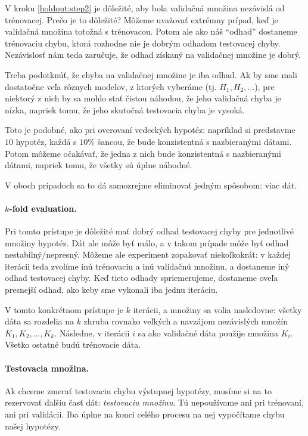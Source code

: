 V kroku \ref{holdout:step2} je dôležité, aby bola validačná
množina nezávislá od trénovacej. Prečo je to dôležité? Môžeme uvažovať
extrémny prípad, keď je validačná množina totožná s trénovacou. Potom
ale ako náš ``odhad'' dostaneme trénovaciu chybu, ktorá rozhodne nie
je dobrým odhadom testovacej chyby. Nezávislosť nám teda zaručuje, že
odhad získaný na validačnej množine je dobrý.

\begin{remark}
  Treba podotknúť, že chyba na validačnej množine je iba odhad. Ak
  by sme mali dostatočne veľa rôznych modelov, z ktorých vyberáme
  (tj. $H_1, H_2, \ldots$), pre niektorý z nich by sa mohlo stať čistou
  náhodou, že jeho validačná chyba je nízka, napriek tomu, že jeho
  skutočná testovacia chyba je vysoká.
  
  Toto je podobné, ako pri overovaní vedeckých hypotéz: napríklad si
  predstavme $10$ hypotéz, každá s $10\%$ šancou, že bude konzistentná
  s nazbieranými dátami. Potom môžeme očakávať, že jedna z nich bude
  konzistentná s nazbieranými dátami, napriek tomu, že všetky sú úplne
  náhodné.
  
  V oboch prípadoch sa to dá samozrejme eliminovať jedným spôsobom:
  viac dát.
\end{remark}

\paragraph{$k$-fold evaluation.} Pri tomto prístupe je dôležité mať
dobrý odhad testovacej chyby pre jednotlivé množiny hypotéz. Dát ale
môže byť málo, a v takom prípade môže byť odhad nestabilný/nepresný.
Môžeme ale experiment zopakovať niekoľkokrát: v každej iterácii teda
zvolíme inú trénovaciu a inú validačnú množinu, a dostaneme iný odhad
testovacej chyby. Keď tieto odhady spriemerujeme, dostaneme oveľa
presnejší odhad, ako keby sme vykonali iba jednu iteráciu.

V tomto konkrétnom prístupe je $k$ iterácii, a množiny sa volia
nasledovne: všetky dáta sa rozdelia na $k$ zhruba rovnako veľkých
a navzájom nezávislých množín $K_1, K_2, \ldots, K_k$. Následne,
v iterácii $i$ sa ako validačné dáta použije množina $K_i$. Všetko
ostatné budú trénovacie dáta.

\paragraph{Testovacia množina.} Ak chceme zmerať testovaciu chybu
výstupnej hypotézy, musíme si na to rezervovať ďalšiu časť dát:
\emph{testovaciu množinu}. Tú nepoužívame ani pri trénovaní, ani
pri validácii. Iba úplne na konci celého procesu na nej vypočítame
chybu našej hypotézy.

